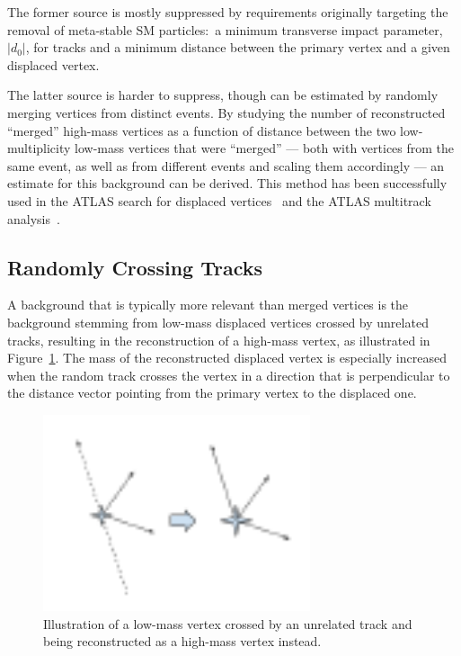 The former source is mostly suppressed by requirements originally targeting the removal of meta-stable SM particles:~a minimum transverse impact parameter, $|d_0|$, for tracks and a minimum distance between the primary vertex and a given displaced vertex.

The latter source is harder to suppress, though can be estimated by randomly merging vertices from distinct events. By studying the number of reconstructed ``merged'' high-mass vertices as a function of distance between the two low-multiplicity low-mass vertices that were ``merged'' --- both with vertices from the same event, as well as from different events and scaling them accordingly --- an estimate for this background can be derived. This method has been successfully used in the ATLAS search for displaced vertices~\cite{Aaboud:2017iio} and the ATLAS multitrack analysis~\cite{Aad:2015rba}.

\subsection{Randomly Crossing Tracks} %

A background that is typically more relevant than merged vertices is the background stemming from low-mass displaced vertices crossed by unrelated tracks, resulting in the reconstruction of a high-mass vertex, as illustrated in Figure~\ref{fig:randomcrossing}. The mass of the reconstructed displaced vertex is especially increased when the random track crosses the vertex in a direction that is perpendicular to the distance vector pointing from the primary vertex to the displaced one.

\begin{figure}[h]
  \centering
  \includegraphics[width=0.7\textwidth]{figures/randomcrossing.pdf}
  \caption{Illustration of a low-mass vertex crossed by an unrelated track and being reconstructed as a high-mass vertex instead.}
  \label{fig:randomcrossing}
\end{figure}

